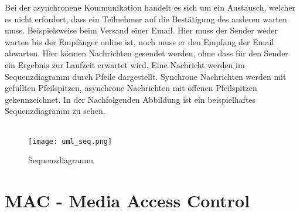 Bei der asynchronene Kommunikation handelt es sich um ein Austausch, welcher es nicht erfordert, dass ein Teilnehmer auf die Bestätigung des anderen warten muss. Beispielsweise beim Versand einer Email. Hier muss der Sender weder warten bis der Empfänger online ist, noch muss er den Empfang der Email abwarten. Hier können Nachrichten gesendet werden, ohne dass für den Sender ein Ergebnis zur Laufzeit erwartet wird.
Eine Nachricht werden im Sequenzdiagramm durch Pfeile dargestellt. Synchrone Nachrichten werden mit gefüllten Pfeilspitzen, asynchrone Nachrichten mit offenen Pfeilspitzen gekennzeichnet. In der Nachfolgenden Abbildung ist ein beispielhaftes Sequenzdiagramm zu sehen.\\
\\
\begin{figure}[H]
\centering
\texttt{[image: uml\_seq.png]}
\caption{Sequenzdiagramm}
\label{fig:show_s1_s2_p1_n1}
\end{figure}

\section{MAC - Media Access Control}
\label{sec:mac}

